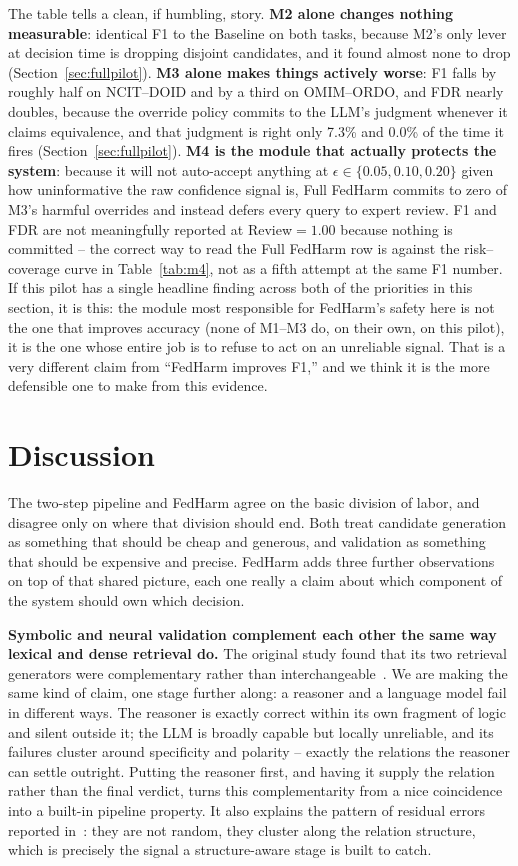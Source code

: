 \documentclass[conference]{IEEEtran}
\begin{document}
The table tells a clean, if humbling, story. \textbf{M2 alone changes nothing measurable}: identical F1 to the Baseline on both tasks, because M2's only lever at decision time is dropping disjoint candidates, and it found almost none to drop (Section~\ref{sec:fullpilot}). \textbf{M3 alone makes things actively worse}: F1 falls by roughly half on NCIT--DOID and by a third on OMIM--ORDO, and FDR nearly doubles, because the override policy commits to the LLM's judgment whenever it claims equivalence, and that judgment is right only 7.3\% and 0.0\% of the time it fires (Section~\ref{sec:fullpilot}). \textbf{M4 is the module that actually protects the system}: because it will not auto-accept anything at $\epsilon \in \{0.05, 0.10, 0.20\}$ given how uninformative the raw confidence signal is, Full FedHarm commits to zero of M3's harmful overrides and instead defers every query to expert review. F1 and FDR are not meaningfully reported at Review$=1.00$ because nothing is committed -- the correct way to read the Full FedHarm row is against the risk--coverage curve in Table~\ref{tab:m4}, not as a fifth attempt at the same F1 number. If this pilot has a single headline finding across both of the priorities in this section, it is this: the module most responsible for FedHarm's safety here is not the one that improves accuracy (none of M1--M3 do, on their own, on this pilot), it is the one whose entire job is to refuse to act on an unreliable signal. That is a very different claim from ``FedHarm improves F1,'' and we think it is the more defensible one to make from this evidence.

\section{Discussion}

The two-step pipeline and FedHarm agree on the basic division of labor, and disagree only on where that division should end. Both treat candidate generation as something that should be cheap and generous, and validation as something that should be expensive and precise. FedHarm adds three further observations on top of that shared picture, each one really a claim about which component of the system should own which decision.

\textbf{Symbolic and neural validation complement each other the same way lexical and dense retrieval do.} The original study found that its two retrieval generators were complementary rather than interchangeable~\cite{b1}. We are making the same kind of claim, one stage further along: a reasoner and a language model fail in different ways. The reasoner is exactly correct within its own fragment of logic and silent outside it; the LLM is broadly capable but locally unreliable, and its failures cluster around specificity and polarity -- exactly the relations the reasoner can settle outright. Putting the reasoner first, and having it supply the relation rather than the final verdict, turns this complementarity from a nice coincidence into a built-in pipeline property. It also explains the pattern of residual errors reported in~\cite{b1}: they are not random, they cluster along the relation structure, which is precisely the signal a structure-aware stage is built to catch.
\end{document}
